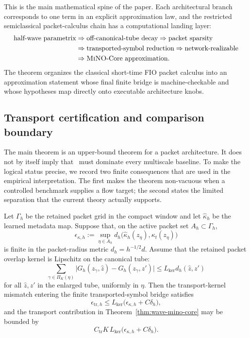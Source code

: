 This is the main mathematical spine of the paper.  Each architectural branch corresponds to one term in an explicit approximation law, and the restricted semiclassical packet-calculus chain has a computational landing layer:
\[
\begin{aligned}
\text{half-wave parametrix}
&\Rightarrow
\text{off-canonical-tube decay}
\Rightarrow
\text{packet sparsity}\\
&\Rightarrow
\text{transported-symbol reduction}
\Rightarrow
\text{network-realizable}\\
&\Rightarrow
\text{\textsc{MiNO}-Core approximation}.
\end{aligned}
\]
The theorem organizes the classical short-time FIO packet calculus into an approximation statement whose final finite bridge is machine-checkable and whose hypotheses map directly onto executable architecture knobs.

\subsection{Transport certification and comparison boundary}
\label{sec:transport-certification}

The main theorem is an upper-bound theorem for a packet architecture.  It does not by itself imply that \MiNO\ must dominate every multiscale baseline.  To make the logical status precise, we record two finite consequences that are used in the empirical interpretation.  The first makes the theorem non-vacuous when a controlled benchmark supplies a flow target; the second states the limited separation that the current theory actually supports.

\begin{proposition}
\label{prop:flow-certificate-budget}
Let $\Gamma_h$ be the retained packet grid in the compact window and let $\hat\kappa_h$ be the learned metadata map.  Suppose that, on the active packet set $A_h\subset\Gamma_h$,
\[
\epsilon_{\kappa,h}
:=
\sup_{\eta\in A_h} d_h\bigl(\hat\kappa_h(z_\eta),\kappa_t(z_\eta)\bigr)
\]
is finite in the packet-radius metric $d_h=h^{-1/2}d$.  Assume that the retained packet overlap kernel is Lipschitz on the canonical tube:
\[
\sum_{\gamma\in \Pi_K(\eta)}
\bigl|
G_h(z_\gamma,\hat z)-G_h(z_\gamma,z')
\bigr|
\le
L_{\mathrm{ker}}d_h(\hat z,z')
\]
for all $\hat z,z'$ in the enlarged tube, uniformly in $\eta$.  Then the transport-kernel mismatch entering the finite transported-symbol bridge satisfies
\[
\epsilon_{\mathrm{tr},h}
\le
L_{\mathrm{ker}}\bigl(\epsilon_{\kappa,h}+C\delta_h\bigr),
\]
and the transport contribution in Theorem~\ref{thm:wave-mino-core} may be bounded by
\[
C_{\mathrm{tr}}K\,L_{\mathrm{ker}}\bigl(\epsilon_{\kappa,h}+C\delta_h\bigr).
\]
\end{proposition}

